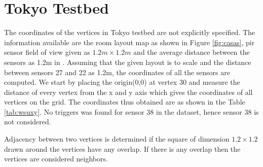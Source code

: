 \chapter{Tokyo Testbed}
\label{app:B}

The coordinates of the vertices in Tokyo testbed are not explicitly specified. The information available are the room layout map as shown in Figure \ref{fig:casas}, pir sensor field of view given as $1.2m \times 1.2m$ and the average distance between the sensors as 1.2m in \cite{crandall2011tracking}. Assuming that the given layout is to scale and the distance between sensors 27 and 22 as 1.2m, the coordinates of all the sensors are computed. We start by placing the origin(0,0) at vertex 30 and measure the distance of every vertex from the x and y axis which gives the coordinates of all vertices on the grid. The coordinates thus obtained are as shown in the Table \ref{tab:wsuxy}. No triggers was found for sensor 38 in the dataset, hence sensor 38 is not considered.

Adjacency between two vertices is determined if the square of dimension $1.2 \times 1.2$ drawn around the vertices have any overlap. If there is any overlap then the vertices are considered neighbors.


